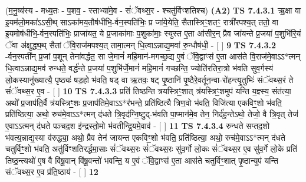 \documentclass[17pt]{extarticle}
\begin{document}
                  \newline
                      (म॒नु॒ष्य॑स्य - मध्य॒तः - प॒शव॒ - स्ताभ्या॑मे॒व - सं॑ॅवथ्स॒र - श्चतु॑र्विꣳशतिश्च)  \textbf{(A2)} \newline \newline
                                        \textbf{ TS 7.4.3.1} \newline
                  ऋ॒क्षा वा इ॒यम॑लो॒मका॑ऽऽसी॒थ् साऽका॑मय॒तौष॑धीभि॒-र्वन॒स्पति॑भिः॒ प्र जा॑ये॒येति॒ सैतास्त्रिꣳ॒॒शतꣳ॒॒ रात्री॑रपश्य॒त् ततो॒ वा इ॒यमोष॑धीभि॒-र्वन॒स्पति॑भिः॒ प्राजा॑यत॒ ये प्र॒जाका॑माः प॒शुका॑माः॒ स्युस्त ए॒ता आ॑सीर॒न् प्रैव जा॑यन्ते प्र॒जया॑ प॒शुभि॑रि॒यं ॅवा अ॑क्षुद्ध्य॒थ् सैतां ॅवि॒राज॑मपश्य॒त् तामा॒त्मन् धि॒त्वाऽन्नाद्य॒मवा॑ रु॒न्धौष॑धी॒ - [  ] \textbf{  9} \newline
                  \newline
                                \textbf{ TS 7.4.3.2} \newline
                  -र्वन॒स्पती᳚न् प्र॒जां प॒शून् तेना॑वर्द्धत॒ सा जे॒मानं॑ महि॒मान॑-मगच्छ॒द्य ए॒वं ॅवि॒द्वाꣳस॑ ए॒ता आस॑ते वि॒राज॑मे॒वाऽऽ*त्मन् धि॒त्वाऽन्नाद्य॒मव॑ रुन्धते॒ वर्द्ध॑न्ते प्र॒जया॑ प॒शुभि॑र्जे॒मानं॑ महि॒मानं॑ गच्छन्ति॒ ज्योति॑रतिरा॒त्रो भ॑वति सुव॒र्गस्य॑ लो॒कस्यानु॑ख्यात्यै॒ पृष्ठ्यः॑ षड॒हो भ॑वति॒ षड् वा ऋ॒तवः॒ षट् पृ॒ष्ठानि॑ पृ॒ष्ठैरे॒वर्तून॒न्वा-रो॑हन्त्यृ॒तुभिः॑ संॅवथ्स॒रं ते सं॑ॅवथ्स॒र ए॒व - [  ] \textbf{  10} \newline
                  \newline
                                \textbf{ TS 7.4.3.3} \newline
                  प्रति॑ तिष्ठन्ति त्रयस्त्रिꣳ॒॒शात् त्र॑यस्त्रिꣳ॒॒शमुप॑ यन्ति य॒ज्ञ्स्य॒ संत॑त्या॒ अथो᳚ प्र॒जाप॑ति॒र्वै त्र॑यस्त्रिꣳ॒॒शः प्र॒जाप॑तिमे॒वाऽऽ*र॑भन्ते॒ प्रति॑ष्ठित्यै त्रिण॒वो भ॑वति॒ विजि॑त्या एकविꣳ॒॒शो भ॑वति॒ प्रति॑ष्ठित्या॒ अथो॒ रुच॑मे॒वाऽऽ*त्मन् द॑धते त्रि॒वृद॑ग्नि॒ष्टुद्-भ॑वति पा॒प्मान॑मे॒व तेन॒ निर्द॑ह॒न्तेऽथो॒ तेजो॒ वै त्रि॒वृत् तेज॑ ए॒वाऽऽत्मन् द॑धते पञ्चद॒श इ॑न्द्रस्तो॒मो भ॑वतीन्द्रि॒यमे॒वाव॑ - [  ] \textbf{  11} \newline
                  \newline
                                \textbf{ TS 7.4.3.4} \newline
                  रुन्धते सप्तद॒शो भ॑वत्य॒न्नाद्य॒स्या व॑रुद्ध्या॒ अथो॒ प्रैव तेन॑ जायन्त एकविꣳ॒॒शो भ॑वति॒ प्रति॑ष्ठित्या॒ अथो॒ रुच॑मे॒वाऽऽ*त्मन् द॑धते चतुर्विꣳ॒॒शो भ॑वति॒ अतु॑र्विꣳशतिरर्द्धमा॒साः सं॑ॅवथ्स॒रः सं॑ॅवथ्स॒रः सु॑व॒र्गो लो॒कः सं॑ॅवथ्स॒र ए॒व सु॑व॒र्गे लो॒के प्रति॑ तिष्ठ॒न्त्यथो॑ ए॒ष वै वि॑षू॒वान् वि॑षू॒वन्तो॑ भवन्ति॒ य ए॒वं ॅवि॒द्वाꣳस॑ ए॒ता आस॑ते चतुर्विꣳ॒॒शात् पृ॒ष्ठान्युप॑ यन्ति संॅवथ्स॒र ए॒व प्र॑ति॒ष्ठाय॑ - [  ] \textbf{  12} \newline
\end{document}

